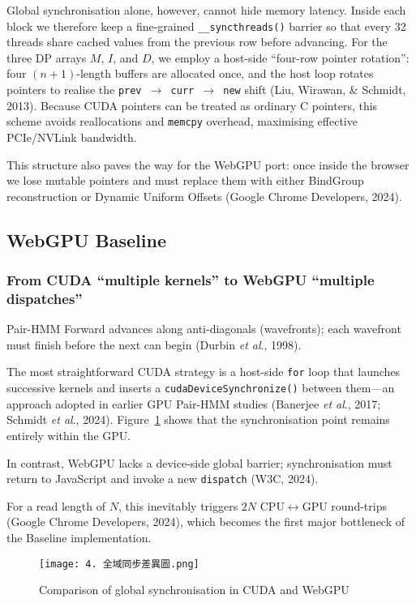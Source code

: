 \documentclass[PhD]{PHlab-thesis}
\begin{document}
Global synchronisation alone, however, cannot hide memory latency. Inside each block we therefore keep a fine-grained \texttt{\_\_syncthreads()} barrier so that every 32 threads share cached values from the previous row before advancing. For the three DP arrays $M$, $I$, and $D$, we employ a host-side “four-row pointer rotation”: four $(n\!+\!1)$-length buffers are allocated once, and the host loop rotates pointers to realise the \texttt{prev $\rightarrow$ curr $\rightarrow$ new} shift (Liu, Wirawan, \& Schmidt, 2013). Because CUDA pointers can be treated as ordinary C pointers, this scheme avoids reallocations and \texttt{memcpy} overhead, maximising effective PCIe/NVLink bandwidth.

This structure also paves the way for the WebGPU port: once inside the browser we lose mutable pointers and must replace them with either BindGroup reconstruction or Dynamic Uniform Offsets (Google Chrome Developers, 2024).




\subsection{WebGPU Baseline}

\subsubsection{From CUDA “multiple kernels” to WebGPU “multiple dispatches”}
Pair-HMM Forward advances along anti-diagonals (wavefronts); each wavefront must finish before the next can begin (Durbin \emph{et al}., 1998).

The most straightforward CUDA strategy is a host-side \texttt{for} loop that launches successive kernels and inserts a \texttt{cudaDeviceSynchronize()} between them—an approach adopted in earlier GPU Pair-HMM studies (Banerjee \emph{et al}., 2017; Schmidt \emph{et al}., 2024). Figure~\ref{fig:global-sync-diff} shows that the synchronisation point remains entirely within the GPU.

In contrast, WebGPU lacks a device-side global barrier; synchronisation must return to JavaScript and invoke a new \texttt{dispatch} (W3C, 2024).

For a read length of $N$, this inevitably triggers $2N$ CPU$\leftrightarrow$GPU round-trips (Google Chrome Developers, 2024), which becomes the first major bottleneck of the Baseline implementation.

\begin{figure}[htbp]
    \centering
    \texttt{[image: 4. 全域同步差異圖.png]}
    \caption{Comparison of global synchronisation in CUDA and WebGPU}
    \label{fig:global-sync-diff}
\end{figure}
\end{document}
